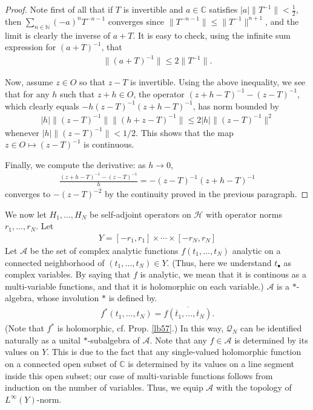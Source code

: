 \documentclass[12pt,b5paper,notitlepage]{article}
\theoremstyle{definition}
\theoremstyle{plain}
\newcommand{\mc}{\mathcal}
\newcommand{\ovl}{\overline}
\newcommand{\blt}{\bullet}
\newcommand{\Cbb}{\mathbb C}
\newcommand{\Nbb}{\mathbb N}
\numberwithin{equation}{section}
\begin{document}
\begin{proof}
Note first of all that if $T$ is invertible and $a\in\Cbb$ satisfies $|a|\lVert T^{-1}\lVert<\frac 12 $, then $\sum_{n\in\Nbb}(-a)^nT^{-n-1}$ converges since $\lVert T^{-n-1}\lVert\leq \lVert T^{-1}\lVert^{n+1}$, and the limit is clearly the inverse of $a+T$. It is easy to check, using the infinite sum expression for $(a+T)^{-1}$, that
\begin{align*}
\lVert(a+T)^{-1}\lVert\leq 2\lVert T^{-1}\lVert.	
\end{align*}
	
Now,   assume $z\in O$ so that $z-T$ is invertible. Using the above inequality, we see that for any $h$ such that $z+h\in O$, the operator $(z+h-T)^{-1}-(z-T)^{-1}$, which clearly equals $-h(z-T)^{-1}(z+h-T)^{-1}$, has norm bounded by
\begin{align*}
|h|\lVert (z-T)^{-1}\lVert	\lVert (h+z-T)^{-1}\lVert\leq 2|h|\lVert (z-T)^{-1}\lVert^2
\end{align*}
whenever $|h|\lVert (z-T)^{-1}\lVert<1/2$. This shows that the map $z\in O\mapsto (z-T)^{-1}$ is continuous.
	
Finally, we compute the derivative: as $h\rightarrow 0$,
\begin{align*}
\frac{(z+h-T)^{-1}-(z-T)^{-1}}{h}	=-(z-T)^{-1}(z+h-T)^{-1}
\end{align*}
converges to $-(z-T)^{-2}$ by the continuity proved in the previous paragraph.
\end{proof}




We now let $H_1,\dots,H_N$ be self-adjoint operators on $\mc H$ with operator norms $r_1,\dots,r_N$. Let
\begin{align*}
Y=[-r_1,r_1]\times\cdots\times[-r_N,r_N]	
\end{align*}
Let $\mc A$ be the set of complex analytic functions $f(t_1,\dots,t_N)$ analytic on a connected neighborhood of $(t_1,\dots,t_N)\in Y$. (Thus, here we understand $t_\blt$ as complex variables. By saying that $f$ is analytic, we mean that it is continous as a multi-variable functions, and that it is holomorphic on each variable.) $\mc A$ is a $*$-algebra, whose involution $*$ is defined by.
\begin{align*}
 f^*(t_1,\dots,t_N)=\ovl{ f(\ovl t_1,\dots,\ovl t_N)}.	
\end{align*}
(Note that $f^*$ is holomorphic, cf. Prop. \ref{lb57}.) In this way, $\mc Q_N$ can be identified naturally  as a unital $*$-subalgebra of $\mc A$. Note that any $f\in\mc A$ is determined by its values on $Y$. This is due to the fact that any single-valued holomorphic function on a connected open subset of $\Cbb$ is determined by its values on a line segment inside this open subset; our case of multi-variable functions follows from induction on the number of variables. Thus, we equip $\mc A$ with the topology of $L^\infty(Y)$-norm.
\end{document}
